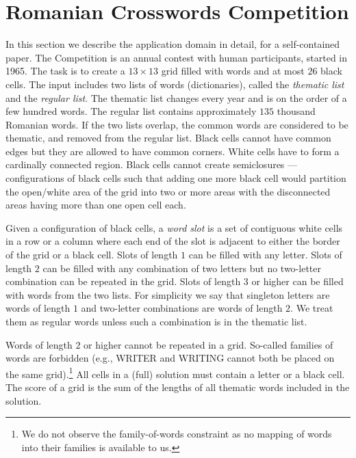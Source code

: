 \section{Romanian Crosswords Competition}
\label{sec::roco}


In this section we describe the application domain in detail,
for a self-contained paper.
The Competition is an annual contest with human participants, started in 1965.
The task is to create a $13\times13$ grid filled with words and
at most $26$ black cells.
The input includes two lists of words (dictionaries), called the \emph{thematic list}
and the \emph{regular list}.
The thematic list changes every year and is on the order of a few hundred words.
The regular list contains approximately $135$ thousand Romanian words.
If the two lists overlap, the common words 
are considered to be thematic, and removed from the regular list.
Black cells cannot have common edges but they are allowed to have common corners. 
White cells have to form a cardinally connected region. Black cells cannot create semiclosures --- configurations of black cells such that
adding one more black cell would partition the open/white area of the grid into two or more
areas with the disconnected areas having more than one open cell each.

Given a configuration of black cells, a \emph{word slot}
is a set of contiguous white cells in a row or a column
where each end of the slot is adjacent to either the 
border of the grid or a black cell.
%
Slots of length $1$ can be filled with any letter.
Slots of length $2$ can be filled with any combination of two letters
but no two-letter combination can be repeated in the grid.
Slots of length $3$ or higher can be filled with words from the two lists.
For simplicity we say that singleton letters are words
of length $1$ and two-letter combinations are words of length $2$.
We treat them as regular words unless such a combination is in the thematic list.%

Words of length $2$ or higher cannot be repeated in a grid.
So-called families of words are forbidden (e.g., 
WRITER and WRITING cannot both be placed on the same grid).\footnote{We do not observe the family-of-words constraint as no mapping of words into their families is available to us.}
All cells in a (full) solution must contain a letter or a black cell.
The score of a grid is the sum of the lengths of all thematic words included in the solution. 

